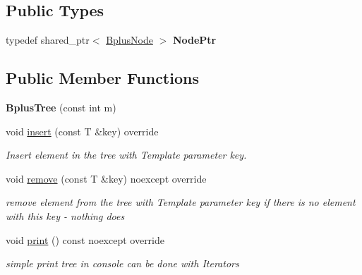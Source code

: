\subsection*{Public Types}
\begin{DoxyCompactItemize}
\item 
\mbox{\label{classBplusTree_a4db76354142996b6c2e943e4bfe82c38}} 
typedef shared\+\_\+ptr$<$ \hyperlink{classBplusTree_1_1BplusNode}{Bplus\+Node} $>$ {\bfseries Node\+Ptr}
\end{DoxyCompactItemize}
\subsection*{Public Member Functions}
\begin{DoxyCompactItemize}
\item 
\mbox{\label{classBplusTree_a95dac42b6d93b4c41bfcd1aacac936d8}} 
{\bfseries Bplus\+Tree} (const int m)
\item 
\mbox{\label{classBplusTree_a706e3329120bd4f25ca0e9ff28eb7e32}} 
void \hyperlink{classBplusTree_a706e3329120bd4f25ca0e9ff28eb7e32}{insert} (const T \&key) override
\begin{DoxyCompactList}\small\item\em Insert element in the tree with Template parameter key. \end{DoxyCompactList}\item 
\mbox{\label{classBplusTree_a7e63275f3226fe9bdb29a4bcbd938fb4}} 
void \hyperlink{classBplusTree_a7e63275f3226fe9bdb29a4bcbd938fb4}{remove} (const T \&key) noexcept override
\begin{DoxyCompactList}\small\item\em remove element from the tree with Template parameter key  if there is no element with this key -\/ nothing does \end{DoxyCompactList}\item 
\mbox{\label{classBplusTree_ad1ae39510e9c7be66119d9387dfe30c5}} 
void \hyperlink{classBplusTree_ad1ae39510e9c7be66119d9387dfe30c5}{print} () const noexcept override
\begin{DoxyCompactList}\small\item\em simple print tree in console  can be done with Iterators \end{DoxyCompactList}\item 

\end{DoxyCompactItemize}
